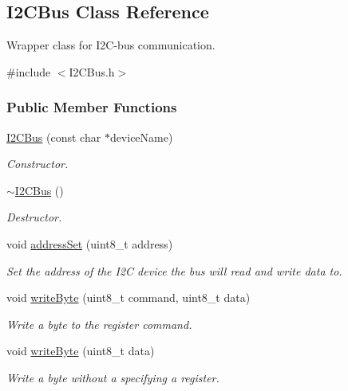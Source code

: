 \hypertarget{class_i2_c_bus}{\subsection{\-I2\-C\-Bus \-Class \-Reference}
\label{class_i2_c_bus}
}


\-Wrapper class for \-I2\-C-\/bus communication.  




{\ttfamily \#include $<$\-I2\-C\-Bus.\-h$>$}

\subsubsection*{\-Public \-Member \-Functions}
\begin{DoxyCompactItemize}
\item 
\hyperlink{class_i2_c_bus_afc250c51eed417b2726c53353cae4083}{\-I2\-C\-Bus} (const char $\ast$device\-Name)
\begin{DoxyCompactList}\small\item\em \-Constructor. \end{DoxyCompactList}\item 
\hyperlink{class_i2_c_bus_a70dac2923cd16ce06f0e73f7fc5bca89}{$\sim$\-I2\-C\-Bus} ()
\begin{DoxyCompactList}\small\item\em \-Destructor. \end{DoxyCompactList}\item 
void \hyperlink{class_i2_c_bus_a3df26769808e1e948dda57cd02680c3d}{address\-Set} (uint8\-\_\-t address)
\begin{DoxyCompactList}\small\item\em \-Set the address of the \-I2\-C device the bus will read and write data to. \end{DoxyCompactList}\item 
void \hyperlink{class_i2_c_bus_a0f9c9c32bff6152119b4ee79f003a1bd}{write\-Byte} (uint8\-\_\-t command, uint8\-\_\-t data)
\begin{DoxyCompactList}\small\item\em \-Write a byte to the register command. \end{DoxyCompactList}\item 
void \hyperlink{class_i2_c_bus_a1e64669ddb6db1efda2525d51e6a99e8}{write\-Byte} (uint8\-\_\-t data)
\begin{DoxyCompactList}\small\item\em \-Write a byte without a specifying a register. \end{DoxyCompactList}\item 

\end{DoxyCompactItemize}
